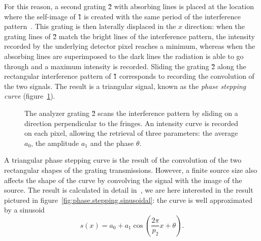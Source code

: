 For this reason, a second grating \G2 with absorbing lines is placed at the
location where the self-image of \G1 is created with the same period of the
interference pattern~\parencite{Pfeiffer2006}. This grating is then laterally displaced in the $x$
direction: when the grating lines of \G2
match the bright lines of the interference pattern, the intensity recorded
by the underlying detector pixel reaches a minimum, whereas when the
absorbing lines are superimposed to the dark lines the radiation is able to
go through and a maximum intensity is recorded. Sliding the grating \G2
along the rectangular interference pattern of \G1 corresponds to recording
the convolution of the two signals. The result is a triangular signal, known
as the \emph{phase stepping curve} (figure~\ref{fig:phase.stepping}).
\begin{figure}[htb]
    \centering
    
    \caption[Phase stepping curve.]{The analyzer grating \G{2} scans the
    interference pattern by sliding on a direction perpendicular to the
    fringes. An intensity curve is recorded on each pixel, allowing the
    retrieval of three parameters: the average $a_0$, the amplitude $a_1$
and the phase $\theta$.}
    \label{fig:phase.stepping}
\end{figure}

A triangular phase stepping curve is the result of the convolution of the
two rectangular shapes of the grating transmissions. However, a finite
source size also affects the shape of the curve by convolving the signal
with the image of the source. The result is calculated in detail
in~\parencite{Bech2009}, we
are here interested in the result pictured in
figure~\ref{fig:phase.stepping.sinusoidal}: the curve is well approximated by a
sinusoid
\begin{equation*}
    s(x) = a_0 + a_1 \cos \left(\frac{2 \pi}{p_2} x + \theta\right).
\end{equation*}

